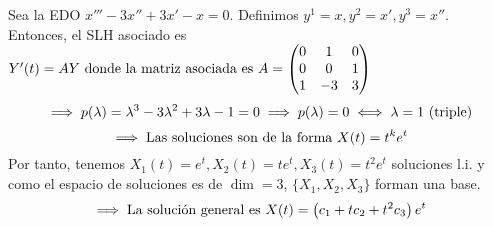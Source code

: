 \begin{ejem}
	Sea la EDO $x''' - 3x'' + 3x' - x = 0$. Definimos $y^1 = x, y^2 = x', y^3 = x''$. Entonces, el SLH asociado es $Y'(t) = AY \text{ donde la matriz asociada es } A = \begin{pmatrix}
			0 & 1  & 0 \\
			0 & 0  & 1 \\
			1 & -3 & 3
		\end{pmatrix}$
	\[\implies p(\lambda) = \lambda^3 - 3\lambda^2 + 3\lambda - 1 = 0 \implies p(\lambda) = 0 \iff \lambda = 1 \text{ (triple)}\]
	\[\implies \text{Las soluciones son de la forma } X(t) = t^k e^{t}\]
	Por tanto, tenemos $X_1(t) = e^t, X_2(t) = te^t, X_3(t) = t^2 e^t$ soluciones l.i. y como el espacio de soluciones es de $\dim = 3$, $\{X_1, X_2, X_3\}$ forman una base.
	\[\implies \text{La solución general es } X(t) = \left(c_1 +tc_2 + t^2c_3\right) e^t\]
\end{ejem}